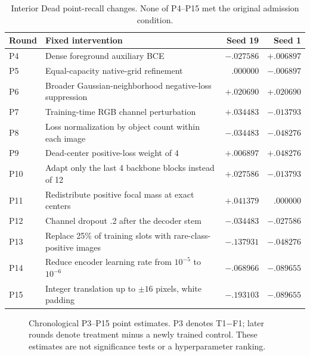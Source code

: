 \documentclass[11pt,a4paper]{article}
\begin{document}
\begin{table}[H]\centering\small
\begin{tabularx}{\linewidth}{p{11mm}Xrr}\toprule
Round & Fixed intervention & Seed 19 & Seed 1\\\midrule
P4 & Dense foreground auxiliary BCE & $-.027586$ & $+.006897$\\
P5 & Equal-capacity native-grid refinement & $.000000$ & $-.006897$\\
P6 & Broader Gaussian-neighborhood negative-loss suppression & $+.020690$ & $+.020690$\\
P7 & Training-time RGB channel perturbation & $+.034483$ & $-.013793$\\
P8 & Loss normalization by object count within each image & $-.034483$ & $-.048276$\\
P9 & Dead-center positive-loss weight of 4 & $+.006897$ & $+.048276$\\
P10 & Adapt only the last 4 backbone blocks instead of 12 & $+.027586$ & $-.013793$\\
P11 & Redistribute positive focal mass at exact centers & $+.041379$ & $.000000$\\
P12 & Channel dropout .2 after the decoder stem & $-.034483$ & $-.027586$\\
P13 & Replace 25\% of training slots with rare-class-positive images & $-.137931$ & $-.048276$\\
P14 & Reduce encoder learning rate from $10^{-5}$ to $10^{-6}$ & $-.068966$ & $-.089655$\\
P15 & Integer translation up to $\pm16$ pixels, white padding & $-.193103$ & $-.089655$\\\bottomrule
\end{tabularx}
\caption{Interior Dead point-recall changes. None of P4--P15 met the original admission condition.}
\end{table}

\begin{figure}[H]\centering
{}
\caption{Chronological P3--P15 point estimates. P3 denotes T1$-$F1; later rounds denote treatment minus a newly trained control. These estimates are not significance tests or a hyperparameter ranking.}
\end{figure}
\end{document}
